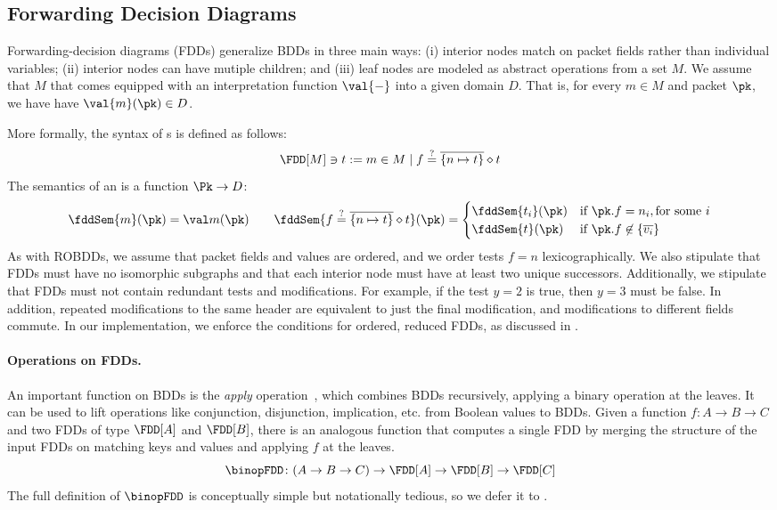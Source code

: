 \subsection{Forwarding Decision Diagrams}\label{sec:fdd}

Forwarding-decision diagrams (FDDs) generalize BDDs in three main
ways: (i) interior nodes match on packet fields rather than individual
variables; (ii) interior nodes can have mutiple children; and (iii)
leaf nodes are modeled as abstract operations from a set $M$. We
assume that $M$ that comes equipped with an interpretation function
$\val{\mathord{-}}$ into a given domain $D$. That is, for every $m\in
M$ and packet $\pk$, we have have $\val{m}(\pk) \in D$.

More formally, the syntax of \FDD s is defined as follows:
\[
\FDD[M] \ni t := m \in M \mid f \stackrel ? = \overline{\{ n\mapsto t\}} \diamond t
\]
%
The semantics of an \FDD is a function $\Pk \rightarrow D$:
\[
\fddSem{m}(\pk) = \val m (\pk) \qquad \fddSem{f \stackrel ? = \overline{\{ n\mapsto t\}} \diamond t}(\pk) = \begin{cases}
\fddSem{t_i}(\pk) &\text{if } \pk.f = n_i, \text{for some }i  \\
\fddSem{t}(\pk) & \text{if } \pk.f \not\in \{\overline{v_i}\}  \\
\end{cases}
\]
As with ROBDDs, we assume that packet fields and values are ordered,
and we order tests $f=n$ lexicographically. We also stipulate that
FDDs must have no isomorphic subgraphs and that each interior node
must have at least two unique successors. Additionally, we stipulate
that FDDs must not contain redundant tests and modifications. For
example, if the test $y=2$ is true, then $y=3$ must be false. In
addition, repeated modifications to the same header are equivalent to
just the final modification, and modifications to different fields
commute. In our implementation, we enforce the conditions for ordered,
reduced FDDs, as discussed in .

\paragraph{Operations on FDDs.}
%
An important function on BDDs is the \emph{apply}
operation~\cite{bryant}, which combines BDDs recursively, applying a
binary operation at the leaves. It can be used to lift operations like
conjunction, disjunction, implication, etc. from Boolean values to
BDDs.  Given a function $f\colon A \to B\to C$ and two FDDs of type
$\FDD[A]$ and $\FDD[B]$, there is an analogous function that computes
a single FDD by merging the structure of the input FDDs on matching
keys and values and applying $f$ at the leaves.
\[
\binopFDD\colon (A\to B\to C)\to \FDD[A] \to \FDD[B] \to \FDD[C] \\
\]
The full definition of $\binopFDD$ is conceptually simple but
notationally tedious, so we defer it to .


